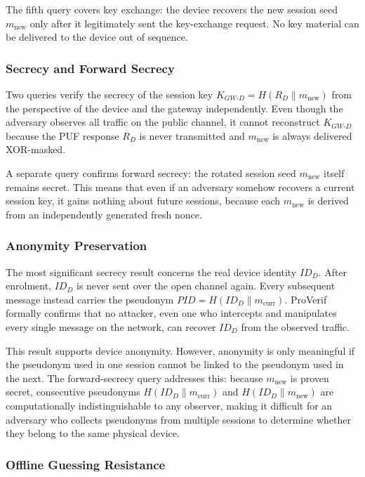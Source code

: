 \documentclass[conference]{IEEEtran}
\begin{document}
The fifth query covers key exchange: the device recovers the new session seed
$m_{\mathrm{new}}$ only after it legitimately sent the key-exchange request.
No key material can be delivered to the device out of sequence.

\subsubsection{Secrecy and Forward Secrecy}

Two queries verify the secrecy of the session key
$K_{GW\text{-}D} = H(R_D \| m_{\mathrm{new}})$ from the perspective of the
device and the gateway independently.  Even though the adversary observes all
traffic on the public channel, it cannot reconstruct $K_{GW\text{-}D}$
because the PUF response $R_D$ is never transmitted and
$m_{\mathrm{new}}$ is always delivered XOR-masked.

A separate query confirms forward secrecy: the rotated session seed
$m_{\mathrm{new}}$ itself remains secret.  This means that even if an
adversary somehow recovers a current session key, it gains nothing about
future sessions, because each $m_{\mathrm{new}}$ is derived from an
independently generated fresh nonce.

\subsubsection{Anonymity Preservation}

The most significant secrecy result concerns the real device identity $ID_D$.
After enrolment, $ID_D$ is never sent over the open channel again.  Every
subsequent message instead carries the pseudonym
$\mathit{PID} = H(ID_D \| m_{\mathrm{curr}})$.
ProVerif formally confirms that no attacker, even one who intercepts and manipulates every single
message on the network, can recover $ID_D$ from the observed traffic.

This result supports device anonymity.  However, anonymity is only meaningful
if the pseudonym used in one session cannot be linked to the pseudonym used in
the next.  The forward-secrecy query addresses this: because
$m_{\mathrm{new}}$ is proven secret, consecutive pseudonyms
$H(ID_D \| m_{\mathrm{curr}})$ and $H(ID_D \| m_{\mathrm{new}})$ are
computationally indistinguishable to any observer, making it difficult for an
adversary who collects pseudonyms from multiple sessions to determine whether
they belong to the same physical device.

\subsubsection{Offline Guessing Resistance}
\end{document}

